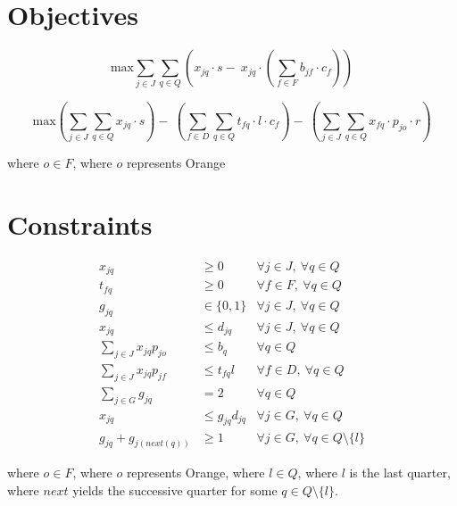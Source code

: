 \documentclass[a4paper]{article}
\newcommand{\SET}[1]{\{ {#1} \}}
\begin{document}
\section*{Objectives}

\[
\text{max} \sum_{j \in J}\sum_{q \in Q} \left(x_{jq} \cdot s -\: x_{jq} \cdot \left(\sum_{f \in F} b_{jf} \cdot c_f\right)\right)
\]

\[
\text{max} 
\left( \sum_{j \in J}\sum_{q \in Q} x_{jq} \cdot s \right) 
-\: 
\left( \sum_{f \in D}\sum_{q \in Q} t_{fq} \cdot l \cdot c_{f} \right) 
-\: 
\left( \sum_{j \in J}\sum_{q \in Q} x_{fq} \cdot p_{jo} \cdot r \right) 
\]

where $o \in F$, where $o$ represents Orange

\section*{Constraints}

\begin{align}
x_{jq} & \geq 0 & \forall j \in J,\  \forall q \in Q \label{C1}\\
t_{fq} & \geq 0 & \forall f \in F,\  \forall q \in Q \label{C2}\\
g_{jq} & \in \SET{0, 1} & \forall j \in J,\ \forall q \in Q \label{C3}\\
x_{jq} & \leq d_{jq} & \forall j \in J,\ \forall q \in Q \label{C4}\\
\sum_{j \in J} x_{jq} p_{jo} & \leq b_q & \forall q \in Q \label{C5}\\
\sum_{j \in J}  x_{jq} p_{jf} & \leq t_{fq} l & \forall f \in D,\ \forall q \in Q \label{C6}\\
\sum_{j \in G}  g_{jq} & = 2 & \forall q \in Q \label{C7}\\
x_{jq} & \leq g_{jq}d_{jq} & \forall j \in G,\ \forall q \in Q \label{C8}\\
g_{jq} + g_{j(next(q))} & \geq 1 & \forall j \in G,\ \forall q \in Q \setminus \SET{l}\label{C9}
\end{align}

where $o \in F$, where $o$ represents Orange, where $l \in Q$, where $l$ is the last quarter, where $next$ yields the successive quarter for some $q \in Q \setminus \SET{l}$.
\end{document}
